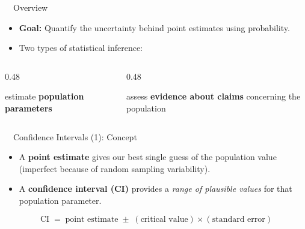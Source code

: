 \documentclass[aspectratio=169,11pt]{beamer}
\begin{document}
\begin{frame}{\ \ Overview}
  \begin{itemize}
    \item \textbf{Goal:} Quantify the uncertainty behind point estimates using probability.
    \item Two types of statistical inference:
  \end{itemize}
  \vspace{0.6em}
  \begin{columns}[T]
    \begin{column}{0.48\textwidth}
      \begin{tcolorbox}[colback=white,colframe=qrnavy,arc=3pt,halign title=center,
        title=\bfseries Confidence Intervals,coltitle=white,colbacktitle=qrnavy]
        \centering estimate \textbf{population parameters}
      \end{tcolorbox}
    \end{column}
    \begin{column}{0.48\textwidth}
      \begin{tcolorbox}[colback=white,colframe=qrnavy,arc=3pt,halign title=center,
        title=\bfseries Hypothesis Tests,coltitle=white,colbacktitle=qrnavy]
        \centering assess \textbf{evidence about claims} concerning the population
      \end{tcolorbox}
    \end{column}
  \end{columns}
\end{frame}

\begin{frame}{\ \ Confidence Intervals (1): Concept}
  \begin{keybox}
    \begin{itemize}
      \item A \textbf{point estimate} gives our best single guess of the population
            value (imperfect because of random sampling variability).
      \item A \textbf{confidence interval (CI)} provides a \emph{range of plausible
            values} for that population parameter.
    \end{itemize}
  \end{keybox}
  \vspace{0.5em}
  \begin{equation*}
    \text{CI} \;=\; \text{point estimate} \;\pm\; (\text{critical value}) \times (\text{standard error})
  \end{equation*}
\end{frame}
\end{document}
